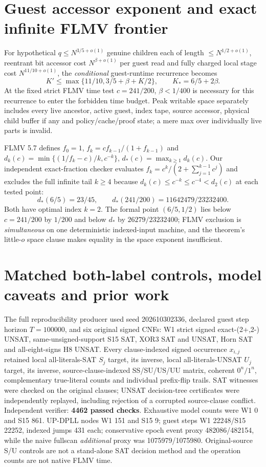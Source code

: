 \documentclass[11pt]{article}
\begin{document}
\section{Guest accessor exponent and exact infinite FLMV frontier}
For hypothetical $q\le N^{3/5+o(1)}$ genuine children each of length $\le N^{1/2+o(1)}$, reentrant bit accessor cost $N^{\beta+o(1)}$ per guest read and fully charged local stage cost $N^{11/10+o(1)}$, the \emph{conditional} guest-runtime recurrence becomes
\[
K'\le\max\{11/10,3/5+\beta+K/2\},\qquad K_*=6/5+2\beta.
\]
At the fixed strict FLMV time test $c=241/200$, $\beta<1/400$ is necessary for this recurrence to enter the forbidden time budget. Peak writable space separately includes every live ancestor, active guest, index tape, source accessor, physical child buffer if any and policy/cache/proof state; a mere max over individually live parts is invalid.

FLMV 5.7 defines $f_0=1$, $f_k=cf_{k-1}/(1+f_{k-1})$ and $d_k(c)=\min\{(1/f_k-c)/k,c^{-k}\}$, $d_*(c)=\max_{k\ge1}d_k(c)$. Our independent exact-fraction checker evaluates $f_k=c^k/(2+\sum_{j=1}^{k-1}c^j)$ and excludes the full infinite tail $k\ge4$ because $d_k(c)\le c^{-k}\le c^{-4}<d_2(c)$ at each tested point:
\[
d_*(6/5)=23/45,\qquad d_*(241/200)=11642479/23232400.
\]
Both have optimal index $k=2$. The formal point $(6/5,1/2)$ lies below $c=241/200$ by $1/200$ and below $d_*$ by $26279/23232400$; FLMV exclusion is \emph{simultaneous} on one deterministic indexed-input machine, and the theorem's little-$o$ space clause makes equality in the space exponent insufficient.

\section{Matched both-label controls, model caveats and prior work}
The full reproducibility producer used seed 202610302336, declared guest step horizon $T=100000$, and six original signed CNFs: W1 strict signed exact-(2+,2-) UNSAT, same-unsigned-support S15 SAT, XOR3 SAT and UNSAT, Horn SAT and all-eight-signs H8 UNSAT. Every clause-indexed signed occurrence $x_{i,j}$ retained local all-literals-SAT $S_j$ target, its inverse, local all-literals-UNSAT $U_j$ target, its inverse, source-clause-indexed SS/SU/US/UU matrix, coherent $0^n/1^n$, complementary true-literal counts and individual prefix-flip trails. SAT witnesses were checked on the original clauses; UNSAT decision-tree certificates were independently replayed, including rejection of a corrupted source-clause conflict. Independent verifier: \textbf{4462 passed checks}. Exhaustive model counts were W1 0 and S15 861. UP-DPLL nodes W1 151 and S15 9; guest steps W1 22248/S15 22252, indexed jumps 431 each; conservative epoch event proxy 482086/482154, while the naive fullscan \emph{additional} proxy was 1075979/1075980. Original-source S/U controls are not a stand-alone SAT decision method and the operation counts are not native FLMV time.
\end{document}

